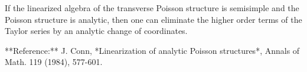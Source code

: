 If the linearized algebra of the transverse Poisson structure is semisimple and the Poisson structure is analytic, then one can eliminate the higher order terms of the Taylor series by an analytic change of coordinates.

**Reference:** J. Conn, *Linearization of analytic Poisson structures*, Annals of Math. 119 (1984), 577-601.
